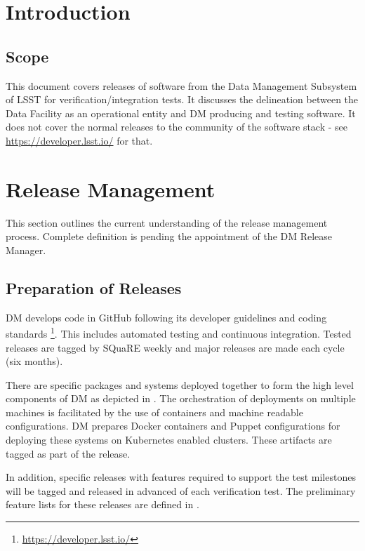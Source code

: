 \section{Introduction}
\subsection{Scope}

This document covers releases of software from the Data Management Subsystem of LSST for verification/integration tests.
It discusses the delineation between the Data Facility as an operational entity and DM producing and testing software.
It does not cover the normal releases to the community of the software stack - see \url{https://developer.lsst.io/} for that.

\section{Release Management}\label{sect:relman}

This section outlines the current understanding of the release management process.
Complete definition is pending the appointment of the DM Release Manager.

\subsection{Preparation of Releases}\label{sect:relprep}

DM develops code in GitHub following its developer guidelines and coding standards \footnote{\url{https://developer.lsst.io/}}.
This includes automated testing and continuous integration.
Tested releases are tagged by SQuaRE weekly and major releases are made each cycle (six months).

There are specific packages and systems deployed together to form the high level components of DM as depicted in .
The orchestration of deployments on multiple machines is facilitated by the use of containers and machine readable configurations.
DM prepares Docker containers and Puppet configurations for deploying these systems on Kubernetes enabled clusters.
These artifacts are tagged as part of the release.

In addition, specific releases with features required to support the  test milestones will be tagged and released in advanced of each verification test.
The preliminary feature lists for these releases are defined in .

